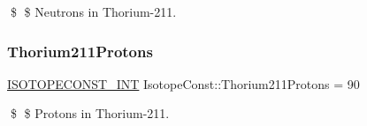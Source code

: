 \$ \$ Neutrons in Thorium-\/211. \mbox{\label{group___isotope_const-_thorium-_th211_gacf456f0d29e7d516234391a2c745e0ff}} 
\subsubsection{\texorpdfstring{Thorium211\+Protons}{Thorium211Protons}}
{\footnotesize\ttfamily \mbox{\hyperlink{group___isotope_const-_macros_ga5f18360b3e99483a35c32d789e62621c}{I\+S\+O\+T\+O\+P\+E\+C\+O\+N\+S\+T\+\_\+\+I\+NT}} Isotope\+Const\+::\+Thorium211\+Protons = 90}

\$ \$ Protons in Thorium-\/211. 
